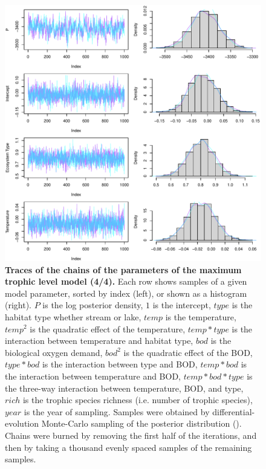 \documentclass[11pt, oneside]{article}
\begin{document}
\begin{figure}[H]
\begin{center}
\includegraphics[page=4, width=1\linewidth]{scripts/b0_6_3/out_mTL/fig_tracePlot_beta.pdf}
\caption{
    \textbf{Traces of the chains of the parameters of the maximum trophic level model (4/4).}
    Each row shows samples of a given model parameter, sorted by index (left), or shown as a histogram (right).
    $P$ is the log posterior density, $1$ is the intercept, $type$ is the habitat type whether stream or lake, $temp$ is the temperature, $temp^2$ is the quadratic effect of the temperature, $temp * type$ is the interaction between temperature and habitat type, $bod$ is the biological oxygen demand, $bod^2$ is the quadratic effect of the BOD, $type * bod$ is the interaction between type and BOD, $temp * bod$ is the interaction between temperature and BOD, $temp * bod * type$ is the three-way interaction between temperature, BOD, and type, $rich$ is the trophic species richness (i.e. number of trophic species), $year$ is the year of sampling.
    Samples were obtained by differential-evolution Monte-Carlo sampling of the posterior distribution (\cite{TerBraak2006}).
    Chains were burned by removing the first half of the iterations, and then by taking a thousand evenly spaced samples of the remaining samples.
} 
\end{center}
\end{figure}
\end{document}
